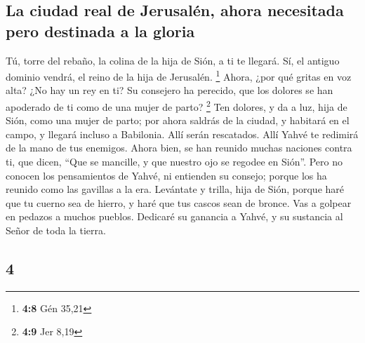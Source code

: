 \begin{paracol}{2}
\hypertarget{la-ciudad-real-de-jerusaluxe9n-ahora-necesitada-pero-destinada-a-la-gloria}{%
\subsection{La ciudad real de Jerusalén, ahora necesitada pero destinada
a la
gloria}\label{la-ciudad-real-de-jerusaluxe9n-ahora-necesitada-pero-destinada-a-la-gloria}}

 Tú, torre del rebaño, la colina de la hija de Sión, a ti
te llegará. Sí, el antiguo dominio vendrá, el reino de la hija de
Jerusalén. \footnote{\textbf{4:8} Gén 35,21}  Ahora, ¿por
qué gritas en voz alta? ¿No hay un rey en ti? Su consejero ha perecido,
que los dolores se han apoderado de ti como de una mujer de parto?
\footnote{\textbf{4:9} Jer 8,19}  Ten dolores, y da a
luz, hija de Sión, como una mujer de parto; por ahora saldrás de la
ciudad, y habitará en el campo, y llegará incluso a Babilonia. Allí
serán rescatados. Allí Yahvé te redimirá de la mano de tus enemigos.
 Ahora bien, se han reunido muchas naciones contra ti,
que dicen, ``Que se mancille, y que nuestro ojo se regodee en Sión''.
 Pero no conocen los pensamientos de Yahvé, ni entienden
su consejo; porque los ha reunido como las gavillas a la era.
 Levántate y trilla, hija de Sión, porque haré que tu
cuerno sea de hierro, y haré que tus cascos sean de bronce. Vas a
golpear en pedazos a muchos pueblos. Dedicaré su ganancia a Yahvé, y su
sustancia al Señor de toda la tierra.

\switchcolumn
\begin{otherlanguage}{english}

\hypertarget{section-7}{%
\section{4}\label{section-7}}


\end{otherlanguage}
\end{paracol}
